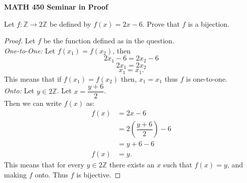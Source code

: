 \documentclass[14pt, fullpage]{article}
\newcommand{\Z}{\mathbb Z}
\begin{document}
\begin{center}
		
{\bf MATH 450 Seminar in Proof}
 \\
\end{center}
	Let $f: \Z \rightarrow 2\Z$ be defined by $f(x) = 2x - 6.$ Prove that $f$ is a bijection.
\begin{proof}
	Let $f$ be the function defined as in the question.\\
	\textit{One-to-One:} Let $f(x_1) = f(x_2)$, then \\
	\begin{equation}
	2x_1 - 6 = 2x_2 - 6
	\end{equation}
	\begin{equation}	
	2x_1 = 2x_2
	\end{equation}
	\begin{equation}
	x_1 = x_1 .
	\end{equation}
	This  means that if $f(x_1) = f(x_2)$ then, $x_1 = x_1$ thus $f$ is one-to-one.\\

	\textit{Onto:} Let $y \in 2\Z$. Let $x = \dfrac{y+6}{2}$. \\ Then we can write $f(x)$ as:
	\begin{equation}			
		\begin{split}
			f(x) &= 2x - 6 \\ 
				 &= 2\left(\dfrac{y+6}{2}\right) - 6\\
				 &= y+6-6\\
			f(x) &= y.		
		\end{split}
	\end{equation}
	This  means that for every $y \in 2\Z$ there exists an $x$ such that $f(x) = y$, and making $f$ onto. Thus $f$ is bijective.
\end{proof}
\end{document}
